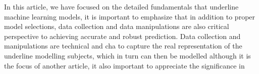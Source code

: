 
\par
In this article, we have focused on the detailed fundamentals that underline machine learning models, it is important to emphasize that in addition to proper model selections, data collection and data manipulations are also critical perspective to achieving accurate and robust prediction. Data collection and manipulations are technical and cha to capture the real representation of the underline modelling subjects, which in turn can then be modelled  although it is the focus of another article, it also important to appreciate the significance in 
\par 
